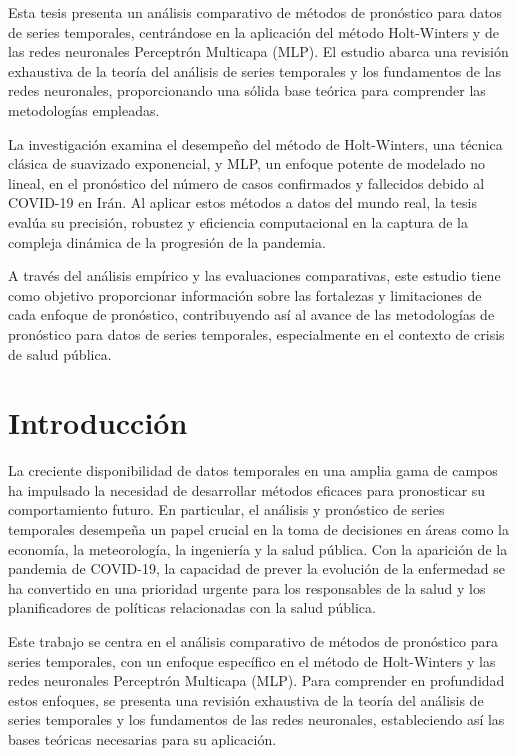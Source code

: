 \documentclass[
  us-letterpaper,
]{scrreprt}
\theoremstyle{plain}
\theoremstyle{definition}
\theoremstyle{definition}
\theoremstyle{plain}
\theoremstyle{remark}
\begin{document}

Esta tesis presenta un análisis comparativo de métodos de pronóstico
para datos de series temporales, centrándose en la aplicación del método
Holt-Winters y de las redes neuronales Perceptrón Multicapa (MLP). El
estudio abarca una revisión exhaustiva de la teoría del análisis de
series temporales y los fundamentos de las redes neuronales,
proporcionando una sólida base teórica para comprender las metodologías
empleadas.

La investigación examina el desempeño del método de Holt-Winters, una
técnica clásica de suavizado exponencial, y MLP, un enfoque potente de
modelado no lineal, en el pronóstico del número de casos confirmados y
fallecidos debido al COVID-19 en Irán. Al aplicar estos métodos a datos
del mundo real, la tesis evalúa su precisión, robustez y eficiencia
computacional en la captura de la compleja dinámica de la progresión de
la pandemia.

A través del análisis empírico y las evaluaciones comparativas, este
estudio tiene como objetivo proporcionar información sobre las
fortalezas y limitaciones de cada enfoque de pronóstico, contribuyendo
así al avance de las metodologías de pronóstico para datos de series
temporales, especialmente en el contexto de crisis de salud pública.


\chapter*{Introducción}\label{introducciuxf3n}


La creciente disponibilidad de datos temporales en una amplia gama de
campos ha impulsado la necesidad de desarrollar métodos eficaces para
pronosticar su comportamiento futuro. En particular, el análisis y
pronóstico de series temporales desempeña un papel crucial en la toma de
decisiones en áreas como la economía, la meteorología, la ingeniería y
la salud pública. Con la aparición de la pandemia de COVID-19, la
capacidad de prever la evolución de la enfermedad se ha convertido en
una prioridad urgente para los responsables de la salud y los
planificadores de políticas relacionadas con la salud pública.

Este trabajo se centra en el análisis comparativo de métodos de
pronóstico para series temporales, con un enfoque específico en el
método de Holt-Winters y las redes neuronales Perceptrón Multicapa
(MLP). Para comprender en profundidad estos enfoques, se presenta una
revisión exhaustiva de la teoría del análisis de series temporales y los
fundamentos de las redes neuronales, estableciendo así las bases
teóricas necesarias para su aplicación.
\end{document}
